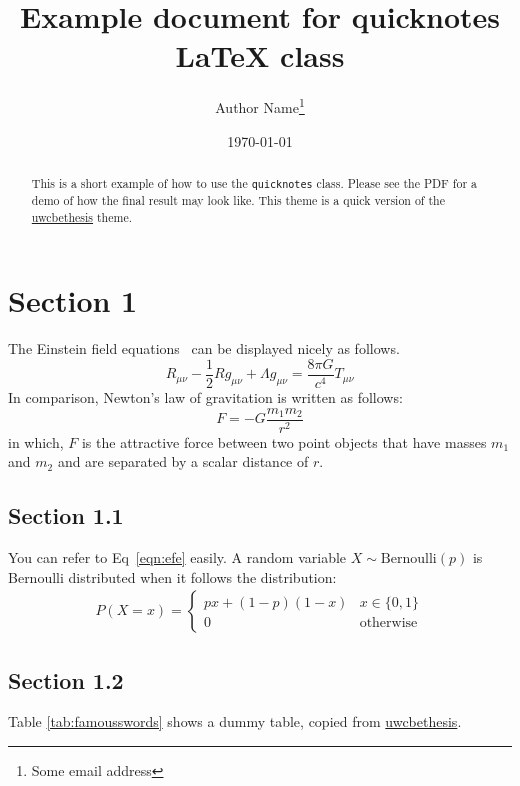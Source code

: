 \documentclass{quicknotes}
\begin{document}
\title{Example document for quicknotes \LaTeX{} class}
\author{Author Name\thanks{Some email address}}
\date{\today}
\maketitle
\begin{abstract}
This is a short example of how to use the \texttt{quicknotes} class. Please see the PDF for a
demo of how the final result may look like. This theme is a quick version of the
\href{https://github.com/ankur-gupta/uwcbethesis}{uwcbethesis} theme.
\end{abstract}

\section{Section 1}
The Einstein field equations~\cite{einstein1916foundation} can be displayed nicely as follows.
\begin{equation}
R_{\mu\nu} - \frac{1}{2} R g_{\mu\nu} + \Lambda g_{\mu\nu} = \frac{8 \pi G}{c^4} T_{\mu\nu}
\label{eqn:efe}
\end{equation}
In comparison, Newton's law of gravitation is written as follows:
\begin{equation}
F = -G\frac{m_1 m_2}   {r^2}
\end{equation}
in which, $F$ is the attractive force between two point objects that have masses $m_1$ and $m_2$
and are separated by a scalar distance of $r$.

\subsection{Section 1.1}
You can refer to Eq~\ref{eqn:efe} easily. A random variable $X\sim \text{Bernoulli}(p)$ is
Bernoulli distributed when it follows the distribution:
\begin{align}
P(X = x) = \begin{cases}
px + (1-p)(1-x) & x \in \{0, 1\} \\
0 & \text{otherwise}
\end{cases} \label{eqn:bernoulli}
\end{align}

\subsection{Section 1.2}
Table \ref{tab:famousswords} shows a dummy table, copied from
\href{https://github.com/ankur-gupta/uwcbethesis}{uwcbethesis}.
\end{document}
